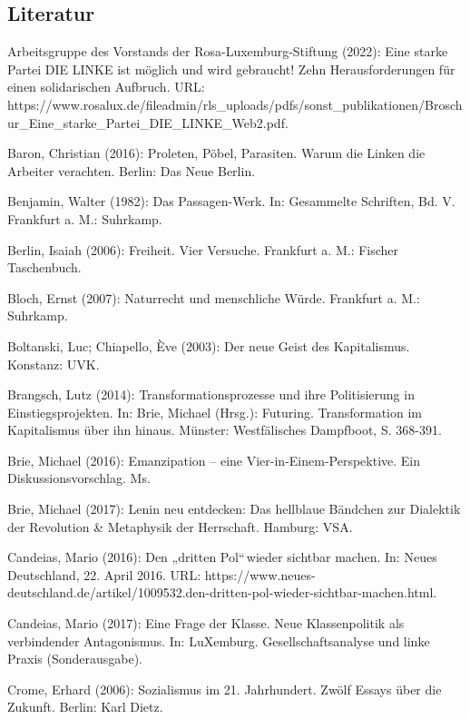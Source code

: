 \begin{multicols*}{2}
\section{Literatur}
    \begin{bibdescription}
        \item Arbeitsgruppe des Vorstands der Rosa-Luxemburg-Stiftung (2022): Eine starke Partei DIE LINKE ist möglich und wird gebraucht! Zehn Herausforderungen für einen solidarischen Aufbruch. URL: https://www.rosalux.de/fileadmin/rls\_uploads/pdfs/sonst\_publikationen/Broschur\_Eine\_starke\_Partei\_DIE\_LINKE\_Web2.pdf. 
        \item Baron, Christian (2016): Proleten, Pöbel, Parasiten. Warum die Linken die Arbeiter verachten. Berlin: Das Neue Berlin.
        \item Benjamin, Walter (1982): Das Passagen-Werk. In: Gesammelte Schriften, Bd. V. Frankfurt a. M.: Suhrkamp.
        \item Berlin, Isaiah (2006): Freiheit. Vier Versuche. Frankfurt a. M.: Fischer Taschenbuch.
        \item Bloch, Ernst (2007): Naturrecht und menschliche Würde. Frankfurt a. M.: Suhrkamp.
        \item Boltanski, Luc; Chiapello, Ève (2003): Der neue Geist des Kapitalismus. Konstanz: UVK.
        \item Brangsch, Lutz (2014): Transformationsprozesse und ihre Politisierung in Einstiegsprojekten. In: Brie, Michael (Hrsg.): Futuring. Transformation im Kapitalismus über ihn hinaus. Münster: Westfälisches Dampfboot, S. 368-391.
        \item  Brie, Michael (2016): Emanzipation – eine Vier-in-Einem-Perspektive. Ein Diskussionsvorschlag. Ms.
        \item Brie, Michael (2017): Lenin neu entdecken: Das hellblaue Bändchen zur Dialektik der Revolution \& Metaphysik der Herrschaft. Hamburg: VSA.
        \item Candeias, Mario (2016): Den „dritten Pol“ wieder sichtbar machen. In: Neues Deutschland, 22. April 2016. URL: https://www.neues-deutschland.de/artikel/1009532.den-dritten-pol-wieder-sichtbar-machen.html.
        \item Candeias, Mario (2017): Eine Frage der Klasse. Neue Klassenpolitik als verbindender Antagonismus. In: LuXemburg. Gesellschaftsanalyse und linke Praxis (Sonderausgabe).
        \item Crome, Erhard (2006): Sozialismus im 21. Jahrhundert. Zwölf Essays über die Zukunft. Berlin: Karl Dietz.

\end{bibdescription}
\end{multicols*}
